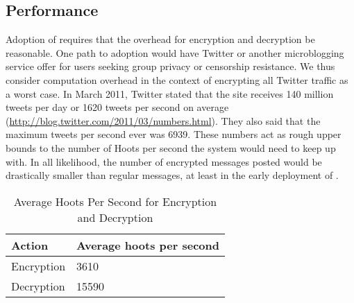 
%

\subsection{Performance}

Adoption of \hoot requires that the overhead for encryption and
decryption be reasonable. One path to adoption would have Twitter or
another microblogging service offer \hoot for users seeking group
privacy or censorship resistance. We thus consider computation overhead
in the context of encrypting all Twitter traffic as a worst case. In
March 2011, Twitter stated that the site receives 140 million tweets per
day or 1620 tweets per second on average
(\url{http://blog.twitter.com/2011/03/numbers.html}). They also said
that the maximum tweets per second ever was 6939. These numbers act as
rough upper bounds to the number of Hoots per second the system would
need to keep up with. In all likelihood, the number of encrypted
messages posted would be drastically smaller than regular messages, at
least in the early deployment of \hoot.

\begin{table}
\caption{Average Hoots Per Second for Encryption and Decryption
\label{tab:hps}
}
\begin{center}
    \begin{tabular}{ l  l }
	\hline
	Action & Average hoots per second \\ \hline
	Encryption & 3610 \\
	Decryption & 15590 \\ \hline
    \end{tabular}
\end{center}
\end{table}

